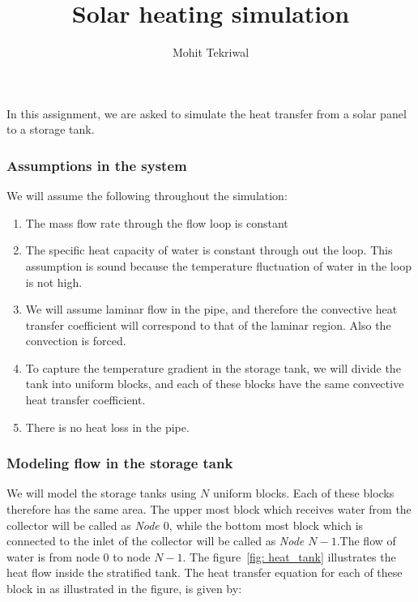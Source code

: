 \documentclass{article}
\title{Solar heating simulation}
\author{Mohit Tekriwal}
\date{}
\begin{document}
\maketitle

In this assignment, we are asked to simulate the heat transfer from a solar panel to a storage tank. 

\subsubsection*{Assumptions in the system}
We will assume the following throughout the simulation:

\begin{enumerate}
\item The mass flow rate through the flow loop is constant
\item The specific heat capacity of water is constant through out the loop. This assumption is sound because the temperature fluctuation of water in the loop is not high.
\item We will assume laminar flow in the pipe, and therefore the convective heat transfer coefficient will correspond to that of the laminar region. Also the convection is forced.
\item To capture the temperature gradient in the storage tank, we will divide the tank into uniform blocks, and each of these blocks have the same convective heat transfer coefficient.
\item There is no heat loss in the pipe.

\end{enumerate}

\subsubsection*{Modeling flow in the storage tank}
We will model the storage tanks using  $N$ uniform blocks. Each of these blocks therefore has the same area. The upper most block which receives water from the collector will be called as \emph{Node $0$}, while the bottom most block which is connected to the inlet of the collector will be called as \emph{Node $N-1$}.The flow of water is from node $0$ to node $N-1$.  The figure~\ref{fig: heat_tank} illustrates the heat flow inside the stratified tank. The heat transfer equation for each of these block in as illustrated in the figure, is given by:
\end{document}
